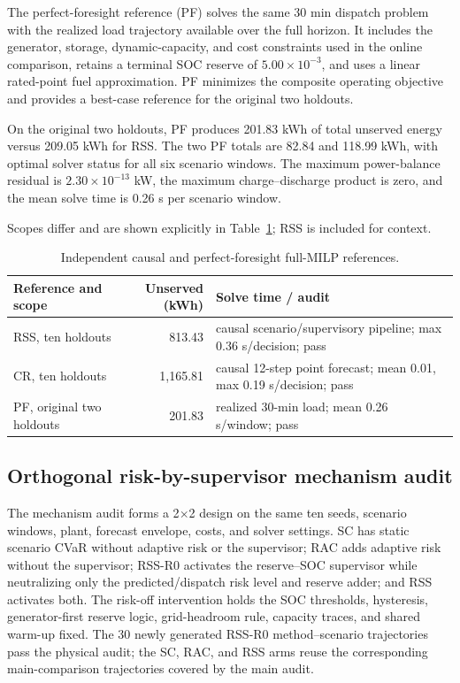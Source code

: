 The perfect-foresight reference (PF) solves the same 30 min dispatch problem
with the realized load trajectory available over the full horizon. It includes
the generator, storage, dynamic-capacity, and cost constraints used in the
online comparison, retains a terminal SOC reserve of $5.00\times10^{-3}$, and
uses a linear rated-point fuel approximation. PF minimizes the composite
operating objective and provides a best-case reference for the original two
holdouts.

On the original two holdouts, PF produces 201.83 kWh of total unserved energy
versus 209.05 kWh for RSS. The two PF totals are 82.84 and 118.99 kWh, with
optimal solver status for all six scenario windows. The maximum
power-balance residual is $2.30\times10^{-13}$ kW, the maximum
charge--discharge product is zero, and the mean solve time is 0.26 s per
scenario window.

Scopes differ and are shown explicitly in Table~\ref{tab:full-milp-references}; RSS is included for context.

\begin{table}[!t]
\caption{Independent causal and perfect-foresight full-MILP references.}
\label{tab:full-milp-references}
\centering
\footnotesize
\begin{tabular}{>{\raggedright\arraybackslash}p{4.6cm}r >{\raggedright\arraybackslash}p{5.0cm}}
\toprule
Reference and scope & Unserved (kWh) & Solve time / audit \\
\midrule
RSS, ten holdouts & 813.43 & causal scenario/supervisory pipeline; max 0.36 s/decision; pass \\
CR, ten holdouts & 1,165.81 & causal 12-step point forecast; mean 0.01, max 0.19 s/decision; pass \\
PF, original two holdouts & 201.83 & realized 30-min load; mean 0.26 s/window; pass \\
\bottomrule
\end{tabular}
\end{table}

\subsection{Orthogonal risk-by-supervisor mechanism
audit}\label{mechanism-ablation-from-frozen-holdout-rows}

The mechanism audit forms a 2$\times$2 design on the same ten seeds, scenario
windows, plant, forecast envelope, costs, and solver settings. SC has static
scenario CVaR without adaptive risk or the supervisor; RAC adds adaptive risk
without the supervisor; RSS-R0 activates the reserve--SOC supervisor while
neutralizing only the predicted/dispatch risk level and reserve adder; and RSS
activates both. The risk-off intervention holds the SOC thresholds,
hysteresis, generator-first reserve logic, grid-headroom rule, capacity traces,
and shared warm-up fixed. The 30 newly generated RSS-R0 method--scenario
trajectories pass the physical audit; the SC, RAC, and RSS arms reuse the
corresponding main-comparison trajectories covered by the main audit.

